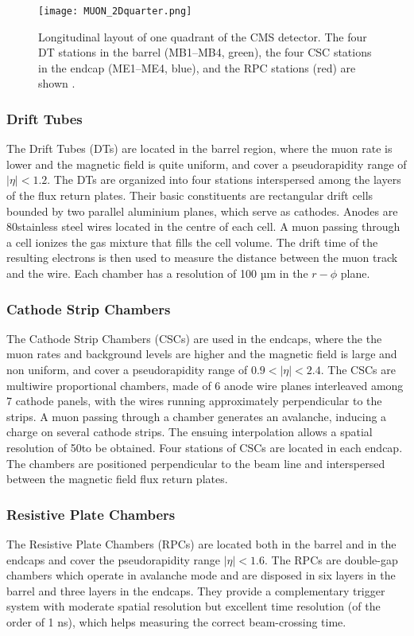 \begin{figure}[thb]
  \centering
  \texttt{[image: MUON\_2Dquarter.png]}
  \caption{Longitudinal layout of one quadrant of the CMS detector.
    The four DT stations in the barrel (MB1–MB4, green),
    the four CSC stations in the endcap (ME1–ME4, blue),
    and the RPC stations (red) are shown \cite{collaboration_2012}.}
  \label{fig:MUON_2Dquarter}
\end{figure}

\subsubsection{Drift Tubes}
The Drift Tubes (DTs) are located in the barrel region, where the muon rate is lower and the magnetic field is quite uniform,
and cover a pseudorapidity range of $|\eta| < 1.2$.
The DTs are organized into four stations interspersed among the layers of the flux return plates.
Their basic constituents are rectangular drift cells bounded by two parallel aluminium planes, which serve as cathodes.
Anodes are 80\mum stainless steel wires located in the centre of each cell.
A muon passing through a cell ionizes the gas mixture that fills the cell volume.
The drift time of the resulting electrons is then used to measure the distance between the muon track and the wire.
Each chamber has a resolution of 100 µm in the $r - \phi$ plane.

\subsubsection{Cathode Strip Chambers}
The Cathode Strip Chambers (CSCs) are used in the endcaps, where the the muon rates and background levels are higher and the magnetic field is large and non uniform,
and cover a pseudorapidity range of $0.9 < |\eta| < 2.4$.
The CSCs are multiwire proportional chambers, made of 6 anode wire planes interleaved among 7 cathode panels,
with the wires running approximately perpendicular to the strips.
A muon passing through a chamber generates an avalanche, inducing a charge on several cathode strips.
The ensuing interpolation allows a spatial resolution of 50\mum to be obtained.
Four stations of CSCs are located in each endcap.
The chambers are positioned perpendicular to the beam line and interspersed between the magnetic field flux return plates.

\subsubsection{Resistive Plate Chambers}
The Resistive Plate Chambers (RPCs) are located both in the barrel and in the endcaps and cover the pseudorapidity range $|\eta| < 1.6$.
The RPCs are double-gap chambers which operate in avalanche mode and are disposed in six layers in the barrel and three layers in the endcaps.
They provide a complementary trigger system with moderate spatial resolution but excellent time resolution (of the order of 1 ns),
which helps measuring the correct beam-crossing time.

